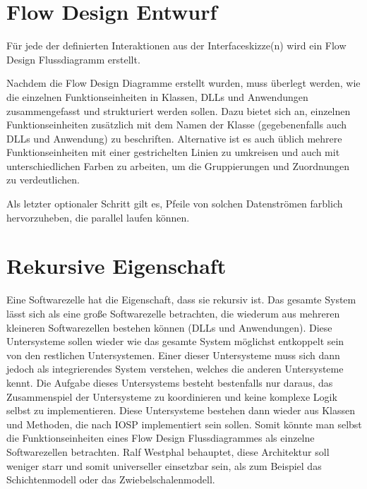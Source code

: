 \section{Flow Design Entwurf}

Für jede der definierten Interaktionen aus der Interfaceskizze(n) wird ein Flow Design Flussdiagramm
erstellt.

Nachdem die Flow Design Diagramme erstellt wurden, muss überlegt werden, wie die
einzelnen Funktionseinheiten in Klassen, DLLs und Anwendungen zusammengefasst
und strukturiert werden sollen.
Dazu bietet sich an, einzelnen Funktionseinheiten zusätzlich mit dem Namen der
Klasse (gegebenenfalls auch DLLs und Anwendung) zu beschriften. Alternative ist es
auch üblich mehrere Funktionseinheiten mit einer gestrichelten Linien zu
umkreisen und auch mit unterschiedlichen Farben zu arbeiten, um die Gruppierungen und Zuordnungen zu verdeutlichen. 

Als letzter optionaler Schritt gilt es, Pfeile von solchen Datenströmen farblich hervorzuheben, die
parallel laufen können.

\section{Rekursive Eigenschaft}

Eine Softwarezelle hat die Eigenschaft, dass sie rekursiv ist.
Das gesamte System lässt sich als eine große Softwarezelle betrachten, die wiederum
aus mehreren kleineren Softwarezellen bestehen können (DLLs und Anwendungen).
Diese Untersysteme sollen wieder wie das gesamte System möglichst entkoppelt
sein von den restlichen Untersystemen. Einer dieser Untersysteme muss sich dann
jedoch als integrierendes System verstehen, welches die anderen Untersysteme
kennt. Die Aufgabe dieses Untersystems besteht bestenfalls nur daraus, das
Zusammenspiel der Untersysteme zu koordinieren und keine komplexe Logik selbst zu implementieren.
Diese Untersysteme bestehen dann wieder aus Klassen und Methoden, die nach IOSP
implementiert sein sollen.
Somit könnte man selbst die Funktionseinheiten eines Flow Design
Flussdiagrammes als einzelne Softwarezellen betrachten.
Ralf Westphal behauptet, diese Architektur soll weniger starr und somit
universeller einsetzbar sein, als zum Beispiel das Schichtenmodell oder das Zwiebelschalenmodell.